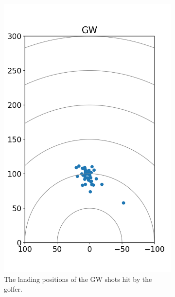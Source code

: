 \documentclass{kththesis}
\begin{document}
\begin{figure}
\begin{subfigure}{0.4\textwidth}
    \includegraphics[height=0.4\textheight]{Shots/GW_shots.png} 
    \caption{The landing positions of the GW shots hit by the golfer.}
    \label{fig:GW_shots}
    \end{subfigure}
    \begin{subfigure}{0.4\textwidth}
    \centering

\end{subfigure}
\end{figure}
\end{document}
